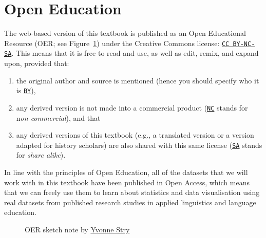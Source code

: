 \documentclass[
  letterpaper,
  DIV=11,
  numbers=noendperiod]{scrreprt}
\begin{document}
\section{Open Education}\label{open-education}

The web-based version of this textbook is published as an Open
Educational Resource (OER; see Figure~\ref{fig-OER}) under the Creative
Commons license:
\href{https://creativecommons.org/licenses/by-nc-sa/4.0/}{\texttt{CC\ BY-NC-SA}}.
This means that it is free to read and use, as well as edit, remix, and
expand upon, provided that:

\begin{enumerate}
\def\labelenumi{\arabic{enumi}.}
\item
  the original author and source is mentioned (hence you should specify
  who it is
  \href{https://creativecommons.org/licenses/by-nc-sa/4.0/}{\texttt{BY}}),
\item
  any derived version is not made into a commercial product
  (\href{https://creativecommons.org/licenses/by-nc-sa/4.0/}{\texttt{NC}}
  stands for n\emph{on-commercial}), and that
\item
  any derived versions of this textbook (e.g., a translated version or a
  version adapted for history scholars) are also shared with this same
  license
  (\href{https://creativecommons.org/licenses/by-nc-sa/4.0/}{\texttt{SA}}
  stands for \emph{share alike}).
\end{enumerate}

In line with the principles of Open Education, all of the datasets that
we will work with in this textbook have been published in Open Access,
which means that we can freely use them to learn about statistics and
data visualisation using real datasets from published research studies
in applied linguistics and language education.

\begin{figure}


\caption{\label{fig-OER}OER sketch note by
\href{https://leko.th-nuernberg.de/portal_digitale_lehre/praxisbeispiele/lehrmaterialien-teilen-fuer-flexibles-lernen/}{Yvonne
Stry}}

\end{figure}%
\end{document}
